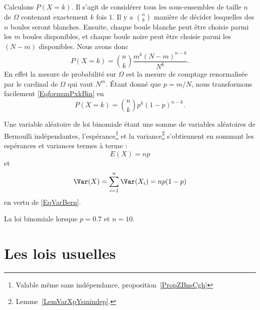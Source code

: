 Calculons \( P(X=k)\). Il s'agit de considérer tous les sous-ensembles de taille \( n\) de \( \Omega\) contenant exactement \( k\) fois \( 1\). Il y a \( {n\choose k}\) manière de décider lesquelles des \( n\) boules seront blanches. Ensuite, chaque boule blanche peut être choisie parmi les \( m\) boules disponibles, et chaque boule noire peut être choisie parmi les  \( (N-m)\) disponibles. Nous avons donc
\begin{equation}        \label{EqformunPxkBin}
	P(X=k)={n\choose k}\frac{ m^k(N-m)^{n-k} }{ N^k }.
\end{equation}
En effet la mesure de probabilité sur \( \Omega\) est la mesure de comptage renormalisée par le cardinal de \( \Omega\) qui vaut \( N^m\). Étant donné que \( p=m/N\), nous transformons facilement \eqref{EqformunPxkBin} en
\begin{equation}
	P(X=k)={n\choose k}p^k(1-p)^{n-k}.
\end{equation}

Une variable aléatoire de loi binomiale étant une somme de variables aléatoires de Bernoulli indépendantes, l'espérance\footnote{Valable même sans indépendance, proposition~\ref{PropZBnsCgh}} et la variance\footnote{Lemme~\ref{LemVarXpYsmindep}.} s'obtiennent en sommant les espérances et variances termes à terme  :
\begin{equation}    \label{EqDGbBgrv}
	E(X)=np
\end{equation}
et
\begin{equation}    \label{EqKLubWlh}
	\Var(X)=\sum_{i=1}^n\Var(X_i)=np(1-p)
\end{equation}
en vertu de \eqref{EqVarBern}.

La loi binomiale lorsque \( p=0.7\) et \( n=10\).       %

\begin{center}
	
\end{center}

\section{Les lois usuelles}

